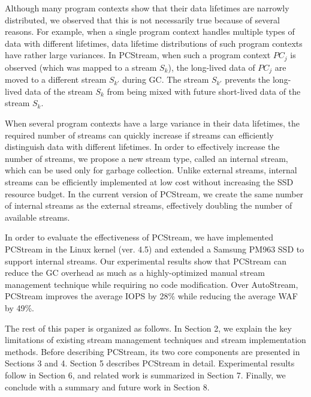 Although many program contexts show that their data lifetimes are 
narrowly distributed, we observed that 
this is not necessarily true because of several reasons.  
For example, when a single program context handles multiple types of data with 
different lifetimes, data lifetime distributions of such
program contexts  
have rather large variances.
In \textsf{\small PCStream}, 
when such a program context {\it $PC_j$} is observed 
(which was mapped to a stream {\it $S_k$}), 
the long-lived data of {\it $PC_j$} are moved to a different stream {\it $S_{k'}$}
during GC.  
The stream {\it $S_{k'}$} prevents the long-lived data of the stream {\it $S_k$} 
from being mixed with future short-lived data of the stream {\it $S_k$}.

When several program contexts have a large variance in their data lifetimes, 
the required number of streams can quickly increase if streams can efficiently 
distinguish data with different lifetimes.
In order to effectively increase the number of streams, we propose a new stream type, 
called an internal stream, which can be used only for garbage collection.
Unlike external streams, internal streams can be efficiently
implemented at low cost without increasing the SSD resource budget.  
In the current version of \textsf{\small PCStream}, we create the same number of internal streams 
as the external streams, effectively doubling the number of available streams. 

In order to evaluate the effectiveness of \textsf{\small PCStream}, 
we have implemented \textsf{\small PCStream}
in the Linux kernel (ver. 4.5) and 
extended a Samsung PM963 SSD to support internal streams.
Our experimental results show that \textsf{\small PCStream}
can reduce the GC overhead as much as a highly-optimized 
manual stream management technique while requiring no code modification.  
Over \textsf{\small AutoStream}, \textsf{\small PCStream} improves the average IOPS
by 28\% while reducing the average WAF by 49\%.

The rest of this paper is organized as follows. 
In Section 2, we explain the key limitations of 
existing stream management techniques and stream implementation methods.
Before describing \textsf{\small PCStream}, its two core components are 
presented in Sections 3 and 4.
Section 5 describes \textsf{\small PCStream} in detail.
Experimental results follow in Section 6,
and related work is summarized in Section 7.  
Finally, we conclude with a summary and future work in Section 8.

